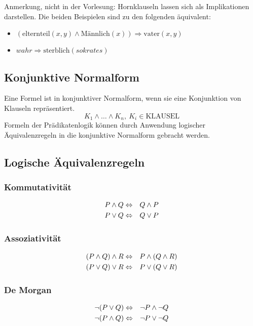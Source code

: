 \documentclass[a4paper]{scrartcl}
\begin{document}
Anmerkung, nicht in der Vorlesung: Hornklauseln lassen sich als Implikationen darstellen. Die beiden Beispielen sind zu den folgenden äquivalent:

\begin{itemize}
\item $(\text{elternteil}(x,y) \wedge \text{Männlich}(x)) \Rightarrow \text{vater}(x,y)$
\item $wahr \Rightarrow \text{sterblich}(sokrates)$
\end{itemize}

\subsection{Konjunktive Normalform}
Eine Formel ist in konjunktiver Normalform, wenn sie eine Konjunktion von Klauseln repräsentiert.
$$K_1 \wedge \ldots \wedge K_n,\ K_i \in \text{KLAUSEL}$$
Formeln der Prädikatenlogik können durch Anwendung logischer Äquivalenzregeln in die konjunktive Normalform gebracht werden.

\subsection{Logische Äquivalenzregeln}
\subsubsection{Kommutativität}
\begin{eqnarray*}
 P \wedge Q & \Leftrightarrow & Q \wedge P \\
 P \vee Q & \Leftrightarrow & Q \vee P 
\end{eqnarray*}

\subsubsection{Assoziativität}
\begin{eqnarray*}
	(P \wedge Q) \wedge R & \Leftrightarrow & P \wedge (Q \wedge R) \\
	(P \vee Q) \vee R & \Leftrightarrow & P \vee (Q \vee R)
\end{eqnarray*}

\subsubsection{De Morgan}
\begin{eqnarray*}
	\neg(P \vee Q)   & \Leftrightarrow & \neg P \wedge \neg Q \\
	\neg(P \wedge Q) & \Leftrightarrow & \neg P \vee \neg Q 
\end{eqnarray*}
\end{document}
